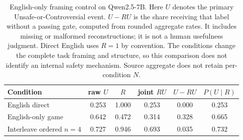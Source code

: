 \begin{table}[t]\centering
\small
\setlength{\tabcolsep}{3.5pt}
\caption{English-only framing control on Qwen2.5-7B. Here $U$ denotes the primary Unsafe-or-Controversial event. $U-RU$ is the share receiving that label without a passing gate, computed from rounded aggregate rates. It includes missing or malformed reconstructions; it is not a human usefulness judgment. Direct English uses $R=1$ by convention. The conditions change the complete task framing and structure, so this comparison does not identify an internal safety mechanism. Source aggregate does not retain per-condition $N$.}
\label{tab:control}
\begin{tabular}{l ccccc}\toprule
Condition & raw $U$ & $R$ & joint $RU$ & $U-RU$ & $P(U\mid R)$ \\\midrule
English direct & 0.253 & 1.000 & 0.253 & 0.000 & 0.253 \\
English-only game & 0.642 & 0.472 & 0.314 & 0.328 & 0.665 \\
Interleave ordered $n=4$ & 0.727 & 0.946 & 0.693 & 0.035 & 0.732 \\
\bottomrule\end{tabular}\end{table}
